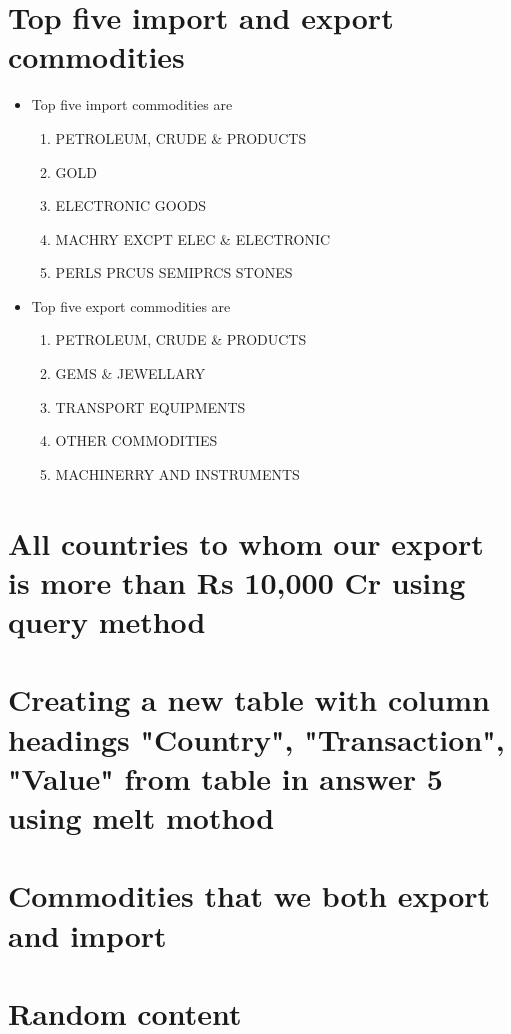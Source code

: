 \documentclass[12pt]{article}
\begin{document}
\section{Top five import and export commodities}
\begin{itemize}
	\item Top five import commodities are
		\begin{enumerate}
			\item PETROLEUM, CRUDE \& PRODUCTS
			\item GOLD
			\item ELECTRONIC GOODS
			\item MACHRY EXCPT ELEC \& ELECTRONIC
			\item PERLS PRCUS SEMIPRCS STONES
		\end{enumerate}


	\item Top five export commodities are
		\begin{enumerate}
			\item PETROLEUM, CRUDE \& PRODUCTS
			\item GEMS \& JEWELLARY
			\item TRANSPORT EQUIPMENTS
			\item OTHER COMMODITIES
			\item MACHINERRY AND INSTRUMENTS
			
		\end{enumerate}
\end{itemize}


\pagebreak
\section{All countries to whom our export is more than Rs 10,000 Cr using query method}


\pagebreak
\section{Creating a new table with column headings "Country", "Transaction", "Value" from table in answer 5 using melt mothod}


\pagebreak
\section{Commodities that we both export and import}


\pagebreak

\section{Random content}
\end{document}
